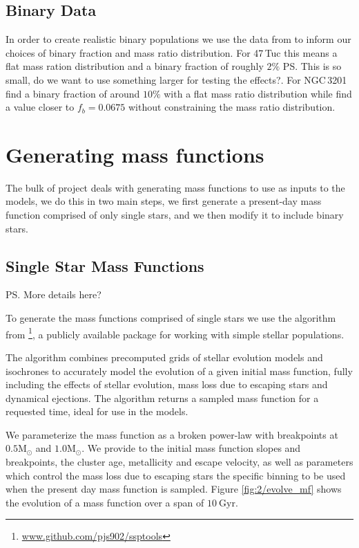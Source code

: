 \subsection{Binary Data}

In order to create realistic binary populations we use the data from \citet{Milone2012} to inform
our choices of binary fraction and mass ratio distribution. For 47\,Tuc this means a flat mass
ration distribution and a binary fraction of roughly $2\%$ \ps{This is so small, do we want to use
	something larger for testing the effects?}.  For NGC\,3201 \citet{Milone2012} find a binary fraction
of around $10\%$ with a flat mass ratio distribution while \citet{Giesers2019} find a value closer
to $f_b = 0.0675$ without constraining the mass ratio distribution.





\section{Generating mass functions}

The bulk of project deals with generating mass functions to use as inputs to the 
models, we do this in two main steps, we first generate a present-day mass function comprised of
only single stars, and we then modify it to include binary stars.

\subsection{Single Star Mass Functions}

\ps{More details here?}

To generate the mass functions comprised of single stars we use the \evolvemf{} algorithm from
\footnote{\url{www.github.com/pjs902/ssptools}}, a publicly available package for
working with simple stellar populations.

The \evolvemf{} algorithm combines precomputed grids of stellar evolution models and isochrones to
accurately model the evolution of a given initial mass function, fully including the effects of
stellar evolution, mass loss due to escaping stars and dynamical ejections. The algorithm returns a
sampled mass function for a requested time, ideal for use in the  models.

We parameterize the mass function as a broken power-law with breakpoints at $0.5 \mathrm{M}_\odot$
and $1.0 \mathrm{M}_\odot$. We provide to \evolvemf{} the initial mass function slopes and
breakpoints, the cluster age, metallicity and escape velocity, as well as parameters which control
the mass loss due to escaping stars the specific binning to be used when the present day mass
function is sampled. Figure \ref{fig:2/evolve_mf} shows the evolution of a mass function over a
span of $10 \ \mathrm{Gyr}$.

